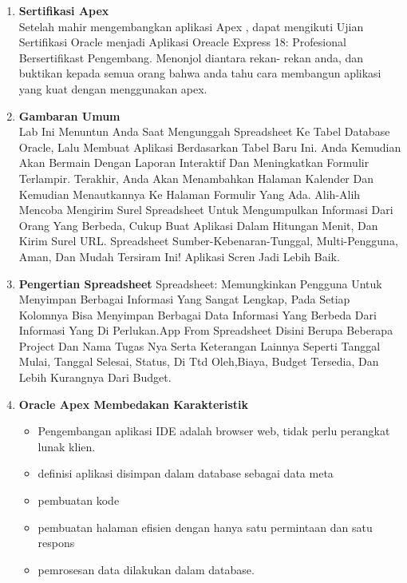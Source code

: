 \documentclass{article}
\begin{document}
\begin{enumerate}
\begin{itemize}
\end{itemize}
\item \textbf{Sertifikasi Apex}\\
Setelah mahir mengembangkan aplikasi Apex , dapat mengikuti Ujian Sertifikasi Oracle menjadi Aplikasi Oreacle Express 18: Profesional Bersertifikast Pengembang. Menonjol diantara rekan- rekan anda, dan buktikan kepada semua orang bahwa anda tahu cara membangun aplikasi yang kuat dengan menggunakan apex.
\item \textbf{Gambaran Umum}\\Lab Ini Menuntun Anda Saat Mengunggah Spreadsheet Ke Tabel Database Oracle, Lalu Membuat Aplikasi Berdasarkan Tabel Baru Ini. Anda Kemudian Akan Bermain Dengan Laporan Interaktif Dan Meningkatkan Formulir Terlampir. Terakhir, Anda Akan Menambahkan Halaman Kalender Dan Kemudian Menautkannya Ke Halaman Formulir Yang Ada. Alih-Alih Mencoba Mengirim Surel Spreadsheet Untuk Mengumpulkan Informasi Dari Orang Yang Berbeda, Cukup Buat Aplikasi Dalam Hitungan Menit, Dan Kirim Surel URL. Spreadsheet Sumber-Kebenaran-Tunggal, Multi-Pengguna, Aman, Dan Mudah Tersiram Ini! Aplikasi Scren Jadi Lebih Baik.\\
\item \textbf{Pengertian Spreadsheet}
Spreadsheet: Memungkinkan Pengguna Untuk Menyimpan Berbagai Informasi Yang Sangat Lengkap, Pada Setiap Kolomnya Bisa Menyimpan Berbagai Data Informasi Yang Berbeda Dari Informasi Yang Di Perlukan.App From Spreadsheet Disini Berupa Beberapa Project Dan Nama Tugas Nya Serta Keterangan Lainnya Seperti Tanggal Mulai, Tanggal Selesai, Status, Di Ttd Oleh,Biaya, Budget Tersedia, Dan Lebih Kurangnya Dari Budget.\\

\item \textbf{Oracle Apex Membedakan Karakteristik}
\begin{itemize}
\item Pengembangan aplikasi IDE adalah browser web, tidak perlu perangkat lunak klien.
\item definisi aplikasi disimpan dalam database sebagai data meta
\item pembuatan kode
\item pembuatan halaman efisien dengan hanya satu permintaan dan satu respons
\item pemrosesan data dilakukan dalam database.
\end{itemize}


\end{enumerate}
\end{document}
